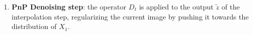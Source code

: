 \documentclass{article} %
\theoremstyle{definition}
\begin{document}
\begin{enumerate}

\item \textbf{PnP Denoising step}: the operator $D_t$ is applied to the output $\tilde{z}$ of the interpolation step, regularizing the current image by pushing it towards the distribution of $X_1$. 
\end{enumerate}
\end{document}
